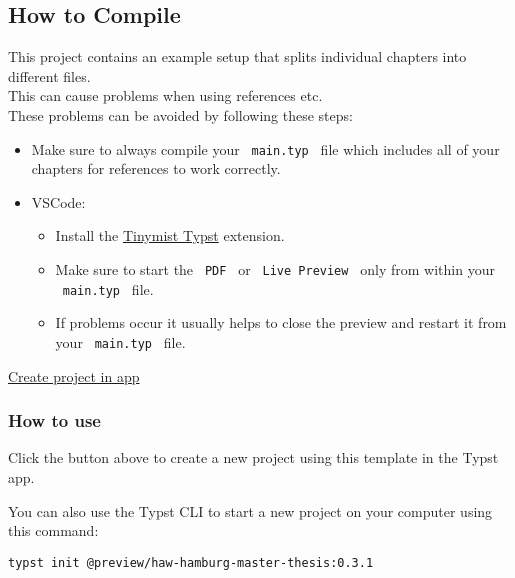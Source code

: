 \subsection{How to Compile}\label{how-to-compile}

This project contains an example setup that splits individual chapters
into different files.\\
This can cause problems when using references etc.\\
These problems can be avoided by following these steps:

\begin{itemize}
\tightlist
\item
  Make sure to always compile your \texttt{\ main.typ\ } file which
  includes all of your chapters for references to work correctly.
\item
  VSCode:

  \begin{itemize}
  \tightlist
  \item
    Install the
    \href{https://marketplace.visualstudio.com/items?itemName=myriad-dreamin.tinymist}{Tinymist
    Typst} extension.
  \item
    Make sure to start the \texttt{\ PDF\ } or
    \texttt{\ Live\ Preview\ } only from within your
    \texttt{\ main.typ\ } file.
  \item
    If problems occur it usually helps to close the preview and restart
    it from your \texttt{\ main.typ\ } file.
  \end{itemize}
\end{itemize}

\href{/app?template=haw-hamburg-master-thesis&version=0.3.1}{Create
project in app}

\subsubsection{How to use}\label{how-to-use}

Click the button above to create a new project using this template in
the Typst app.

You can also use the Typst CLI to start a new project on your computer
using this command:

\begin{verbatim}
typst init @preview/haw-hamburg-master-thesis:0.3.1
\end{verbatim}




